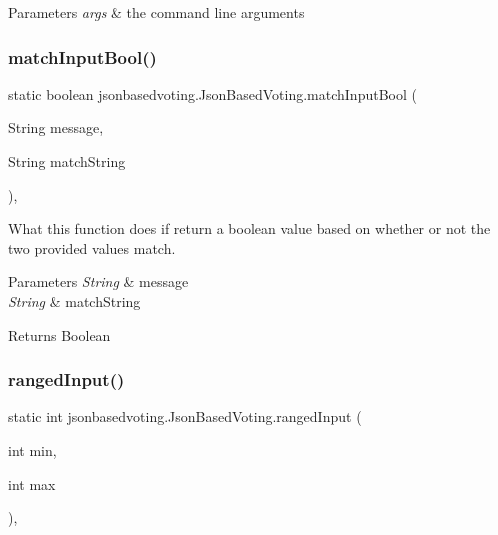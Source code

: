 \begin{DoxyParams}{Parameters}
{\em args} & the command line arguments \\
\hline
\end{DoxyParams}
\mbox{\label{classjsonbasedvoting_1_1_json_based_voting_a673611911f12dcd3b928673fe7d839a8}} 
\subsubsection{\texorpdfstring{matchInputBool()}{matchInputBool()}}
{\footnotesize\ttfamily static boolean jsonbasedvoting.\+Json\+Based\+Voting.\+match\+Input\+Bool (\begin{DoxyParamCaption}\item[{String}]{message,  }\item[{String}]{match\+String }\end{DoxyParamCaption})\hspace{0.3cm}{\ttfamily [static]}, {\ttfamily [package]}}

What this function does if return a boolean value based on whether or not the two provided values match. 
\begin{DoxyParams}{Parameters}
{\em String} & message \\
\hline
{\em String} & match\+String \\
\hline
\end{DoxyParams}
\begin{DoxyReturn}{Returns}
Boolean 
\end{DoxyReturn}
\mbox{\label{classjsonbasedvoting_1_1_json_based_voting_afd126df60c7e38e0fe9064a374d94e7f}} 
\subsubsection{\texorpdfstring{rangedInput()}{rangedInput()}}
{\footnotesize\ttfamily static int jsonbasedvoting.\+Json\+Based\+Voting.\+ranged\+Input (\begin{DoxyParamCaption}\item[{int}]{min,  }\item[{int}]{max }\end{DoxyParamCaption})\hspace{0.3cm}{\ttfamily [static]}, {\ttfamily [package]}}

